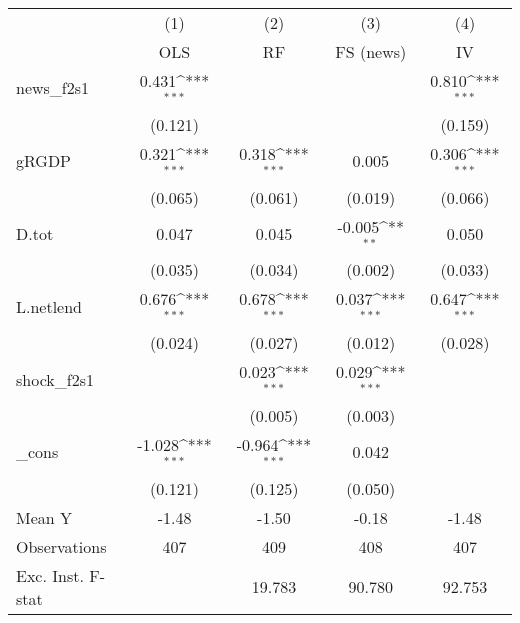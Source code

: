 {
\def\sym#1{\ifmmode^{#1}\else\(^{#1}\)\fi}
\begin{tabular}{l*{4}{c}}
\toprule
            &\multicolumn{1}{c}{(1)}&\multicolumn{1}{c}{(2)}&\multicolumn{1}{c}{(3)}&\multicolumn{1}{c}{(4)}\\
            &\multicolumn{1}{c}{OLS}&\multicolumn{1}{c}{RF}&\multicolumn{1}{c}{FS (news)}&\multicolumn{1}{c}{IV}\\
\midrule
news\_f2s1   &       0.431\sym{***}&                     &                     &       0.810\sym{***}\\
            &     (0.121)         &                     &                     &     (0.159)         \\
\addlinespace
gRGDP       &       0.321\sym{***}&       0.318\sym{***}&       0.005         &       0.306\sym{***}\\
            &     (0.065)         &     (0.061)         &     (0.019)         &     (0.066)         \\
\addlinespace
D.tot       &       0.047         &       0.045         &      -0.005\sym{**} &       0.050         \\
            &     (0.035)         &     (0.034)         &     (0.002)         &     (0.033)         \\
\addlinespace
L.netlend   &       0.676\sym{***}&       0.678\sym{***}&       0.037\sym{***}&       0.647\sym{***}\\
            &     (0.024)         &     (0.027)         &     (0.012)         &     (0.028)         \\
\addlinespace
shock\_f2s1  &                     &       0.023\sym{***}&       0.029\sym{***}&                     \\
            &                     &     (0.005)         &     (0.003)         &                     \\
\addlinespace
\_cons      &      -1.028\sym{***}&      -0.964\sym{***}&       0.042         &                     \\
            &     (0.121)         &     (0.125)         &     (0.050)         &                     \\
\midrule
Mean Y      &       -1.48         &       -1.50         &       -0.18         &       -1.48         \\
Observations&         407         &         409         &         408         &         407         \\
Exc. Inst. F-stat&                     &      19.783         &      90.780         &      92.753         \\
\bottomrule
\end{tabular}
}
